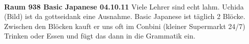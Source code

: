 \documentclass{article}
\begin{document}
	\paragraph{}
	\doublespacing
	\textbf{Raum 938 Basic Japanese 04.10.11}
	\singlespacing
	Viele Lehrer sind echt lahm. Uchida (Bild) ist da gottseidank eine Ausnahme. Basic Japanese ist täglich 2 Blöcke. Zwischen den Blöcken kauft er uns oft im Conbini (kleiner Supermarkt 24/7) Trinken oder Essen und fügt das dann in die Grammatik ein.
%	
\end{document}
